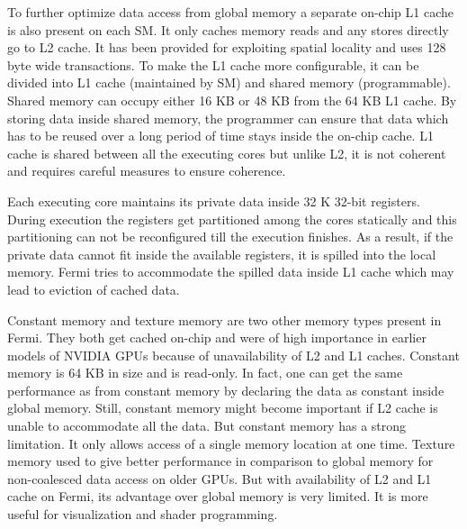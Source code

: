 To further optimize data access from global memory a separate on-chip L1 cache is also present on each SM. It only caches memory reads and any stores directly go to L2 cache. It has been provided for exploiting spatial locality and uses 128  byte wide transactions. To make the L1 cache more configurable, it can be divided into L1 cache (maintained by SM) and shared memory (programmable). Shared memory can occupy either 16 KB or 48 KB from the 64 KB L1 cache. By storing data inside shared memory, the programmer can ensure that data which has to be reused over a long period of time stays inside the on-chip cache. L1 cache is shared between all the executing cores but unlike L2, it is not coherent and requires careful measures to ensure coherence.

Each executing core maintains its private data inside 32 K 32-bit registers. During execution the registers get partitioned among the cores statically and this partitioning can not be reconfigured till the execution finishes. As a result, if the private data cannot fit inside the available registers, it is spilled into the local memory. Fermi tries to accommodate the spilled data inside L1 cache which may lead to eviction of cached data.

Constant memory and texture memory are two other memory types present in Fermi. They both get cached on-chip and were of high importance in earlier models of NVIDIA GPUs because of unavailability of L2 and L1 caches. Constant memory is 64 KB in size and is read-only. In fact, one can get the same performance as from constant memory by declaring the data as constant inside global memory. Still, constant memory might become important if L2 cache is unable to accommodate all the data. But constant memory has a strong limitation. It only allows access of a single memory location at one time. Texture memory used to give better performance in comparison to global memory for non-coalesced data access on older GPUs. But with availability of L2 and L1 cache on Fermi, its advantage over global memory is very limited. It is more useful for visualization and shader programming.

